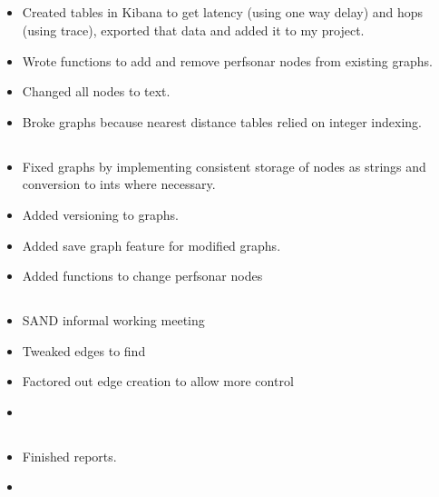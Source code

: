 \documentclass{weeklyreport}
\begin{document}
\subsection*{}

\begin{itemize}
    \item Created tables in Kibana to get latency (using one way delay) and hops (using trace), exported that data and added it to my project.
    \item Wrote functions to add and remove perfsonar nodes from existing graphs.
    \item Changed all nodes to text.
    \item Broke graphs because nearest distance tables relied on integer indexing.
\end{itemize}

\subsection*{}

\begin{itemize}
    \item Fixed graphs by implementing consistent storage of nodes as strings and conversion to ints where necessary.
    \item Added versioning to graphs.
    \item Added save graph feature for modified graphs.
    \item Added functions to change perfsonar nodes
\end{itemize}

\subsection*{}

\begin{itemize}
	\item SAND informal working meeting
    \item Tweaked edges to find
    \item Factored out edge creation to allow more control
    \item 
\end{itemize}


\subsection*{}

\begin{itemize}
	\item Finished reports.
	\item 
\end{itemize}
\end{document}
